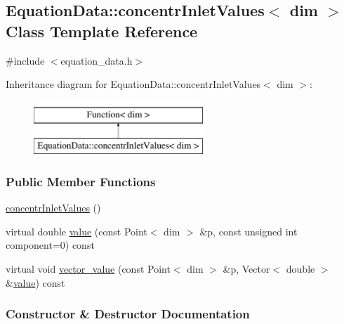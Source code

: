 \hypertarget{class_equation_data_1_1concentr_inlet_values}{}\subsection{Equation\+Data\+:\+:concentr\+Inlet\+Values$<$ dim $>$ Class Template Reference}
\label{class_equation_data_1_1concentr_inlet_values}


{\ttfamily \#include $<$equation\+\_\+data.\+h$>$}

Inheritance diagram for Equation\+Data\+:\+:concentr\+Inlet\+Values$<$ dim $>$\+:\begin{figure}[H]
\begin{center}
\leavevmode
\includegraphics[height=2.000000cm]{class_equation_data_1_1concentr_inlet_values}
\end{center}
\end{figure}
\subsubsection*{Public Member Functions}
\begin{DoxyCompactItemize}
\item 
\hyperlink{class_equation_data_1_1concentr_inlet_values_a8b12d233a24b1f06625b884c0a649004}{concentr\+Inlet\+Values} ()
\item 
virtual double \hyperlink{class_equation_data_1_1concentr_inlet_values_a819feb903b5bf6afe1aa0ab0f62d31a8}{value} (const Point$<$ dim $>$ \&p, const unsigned int component=0) const 
\item 
virtual void \hyperlink{class_equation_data_1_1concentr_inlet_values_a8b14d66851e8d02b563317ed20ff1a46}{vector\+\_\+value} (const Point$<$ dim $>$ \&p, Vector$<$ double $>$ \&\hyperlink{class_equation_data_1_1concentr_inlet_values_a819feb903b5bf6afe1aa0ab0f62d31a8}{value}) const 
\end{DoxyCompactItemize}


\subsubsection{Constructor \& Destructor Documentation}
\hypertarget{class_equation_data_1_1concentr_inlet_values_a8b12d233a24b1f06625b884c0a649004}{}
